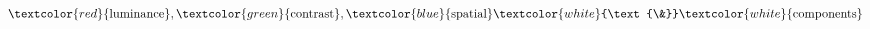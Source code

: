 \documentclass[preview]{standalone}
\begin{document}
\begin{align*}
\textcolor{red}{\text{luminance}}, \textcolor{green}{\text{contrast}}, \textcolor{blue}{\text{spatial}} \textcolor{white}{\text{\&}} \textcolor{white}{\text{components}}
\end{align*}
\end{document}

